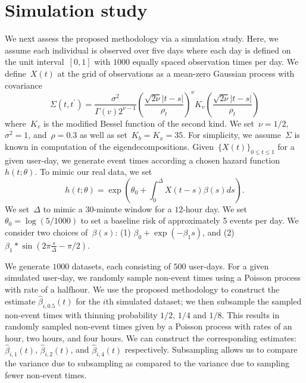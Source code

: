 \documentclass[12pt]{amsart}
\begin{document}
\section{Simulation study} \label{section:simstudy}

We next assess the proposed methodology via a simulation study. Here, we assume each individual is observed over five days where each day is defined on the unit interval~$[0,1]$ with $1000$ equally spaced observation times per day. We define~$X(t)$ at the grid of observations as a mean-zero Gaussian process with covariance
\[
  \Sigma (t, t^\prime) =
  \frac{\sigma^2}{\Gamma (v) 2^{\nu-1}}
  \left( \frac{\sqrt{2 \nu} |t-s|}{\rho_t} \right)^{\nu}
  K_v \left( \frac{\sqrt{2 \nu} |t-s|}{\rho_t} \right)
\]
where~$K_v$ is the modified Bessel function of the second kind.  We set~$\nu = 1/2$, $\sigma^2 = 1$, and~$\rho = 0.3$ as well as set~$K_b = K_x = 35$.  For simplicity, we assume~$\Sigma$ is known in computation of the eigendecompositions. Given~$\{ X(t) \}_{0 \leq t \leq 1}$ for a given user-day, we generate event times according a chosen hazard function~$h (t; \theta)$.  To mimic our real data, we set
\[
h(t; \theta) = \exp \left( \theta_0 + \int_{0}^{\Delta} X(t-s) \beta(s) ds \right).
\]
We set~$\Delta$ to mimic a 30-minute window for a $12$-hour day.  We set~$\theta_0 = \log(5/1000)$ to set a baseline risk of approximately 5 events per day. We consider two choices of~$\beta(s)$: (1) $\beta_0 + \exp(- \beta_1 s) $, and (2) $\beta_1  * \sin \left( 2 \pi \frac{s}{\Delta} - \pi/2 \right)$.

We generate $1000$ datasets, each consisting of $500$ user-days.  For a given simulated user-day, we randomly sample non-event times using a Poisson process with rate of a halfhour.  We use the proposed methodology to construct the estimate $\hat \beta_{i,0.5} (t)$ for the $i$th simulated dataset; we then subsample the sampled non-event times with thinning probability $1/2$, $1/4$ and $1/8$.  This results in randomly sampled non-event times given by a Poisson process with rates of an hour, two hours, and four hours.  We can construct the corresponding estimates: $\hat \beta_{i,1} (t)$, $\hat \beta_{i,2} (t)$, and $\hat \beta_{i,4} (t)$ respectively. Subsampling allows us to compare the variance due to subsampling as compared to the variance due to sampling fewer non-event times.
\end{document}
